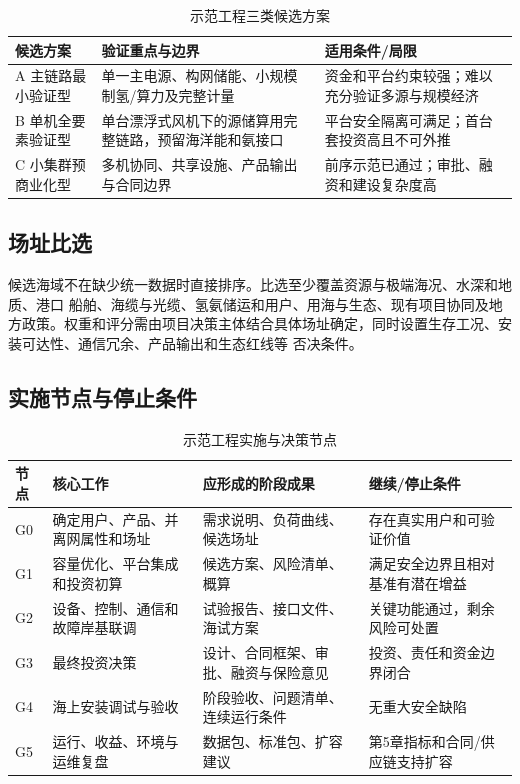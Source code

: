 \begin{table}[H]
\centering
\caption{示范工程三类候选方案}
\label{tab:c6-demo-options}
\begin{tabularx}{\textwidth}{p{2.5cm} X X}
\toprule
候选方案 & 验证重点与边界 & 适用条件/局限\\
\midrule
A 主链路最小验证型 & 单一主电源、构网储能、小规模制氢/算力及完整计量 & 资金和平台约束较强；难以充分验证多源与规模经济\\
B 单机全要素验证型 & 单台漂浮式风机下的源储算用完整链路，预留海洋能和氨接口 & 平台安全隔离可满足；首台套投资高且不可外推\\
C 小集群预商业化型 & 多机协同、共享设施、产品输出与合同边界 & 前序示范已通过；审批、融资和建设复杂度高\\
\bottomrule
\end{tabularx}
\end{table}

\subsection{场址比选}

候选海域不在缺少统一数据时直接排序。比选至少覆盖资源与极端海况、水深和地质、港口
船舶、海缆与光缆、氢氨储运和用户、用海与生态、现有项目协同及地方政策。权重和评分需由项目决策主体结合具体场址确定，同时设置生存工况、安装可达性、通信冗余、产品输出和生态红线等
否决条件。

\subsection{实施节点与停止条件}

\begin{table}[H]
\centering
\caption{示范工程实施与决策节点}
\label{tab:c6-demo-gates}
\footnotesize
\begin{tabularx}{\textwidth}{p{1.6cm} p{3cm} X X}
\toprule
节点 & 核心工作 & 应形成的阶段成果 & 继续/停止条件\\
\midrule
G0 & 确定用户、产品、并离网属性和场址 & 需求说明、负荷曲线、候选场址 & 存在真实用户和可验证价值\\
G1 & 容量优化、平台集成和投资初算 & 候选方案、风险清单、概算 & 满足安全边界且相对基准有潜在增益\\
G2 & 设备、控制、通信和故障岸基联调 & 试验报告、接口文件、海试方案 & 关键功能通过，剩余风险可处置\\
G3 & 最终投资决策 & 设计、合同框架、审批、融资与保险意见 & 投资、责任和资金边界闭合\\
G4 & 海上安装调试与验收 & 阶段验收、问题清单、连续运行条件 & 无重大安全缺陷\\
G5 & 运行、收益、环境与运维复盘 & 数据包、标准包、扩容建议 & 第5章指标和合同/供应链支持扩容\\
\bottomrule
\end{tabularx}
\end{table}

